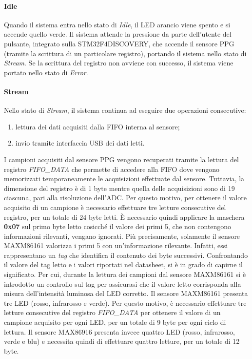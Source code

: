 \paragraph{Idle}
Quando il sistema entra nello stato di \textit{Idle}, il LED arancio viene spento e si accende quello verde. Il sistema attende la pressione da parte dell'utente del pulsante, integrato sulla STM32F4DISCOVERY, che accende il sensore PPG (tramite la scrittura di un particolare registro), portando il sistema nello stato di \textit{Stream}. Se la scrittura del registro non avviene con successo, il sistema viene portato nello stato di \textit{Error}.
\paragraph{Stream}
Nello stato di \textit{Stream}, il sistema continua ad eseguire due operazioni consecutive:
\begin{enumerate}
	\item lettura dei dati acquisiti dalla FIFO interna al sensore;
	\item invio tramite interfaccia USB dei dati letti.
\end{enumerate}
I campioni acquisiti dal sensore PPG vengono recuperati tramite la lettura del registro \textit{FIFO\_DATA} che permette di accedere alla FIFO dove vengono memorizzati temporaneamente le acquisizioni effettuate dal sensore. Tuttavia, la dimensione del registro è di 1 byte mentre quella delle acquisizioni sono di \SI{19}{\bit} ciascuna, pari alla risoluzione dell'ADC. Per questo motivo, per ottenere il valore acquisito di un campione è necessario effettuare tre letture consecutive del registro, per un totale di 24 byte letti. \`E necessario quindi applicare la maschera \textbf{0x07} sul primo byte letto cosicché il valore dei primi \SI{5}{\bit}, che non contengono informazioni rilevanti, vengano ignorati. Più precisamente, solamente il sensore MAXM86161 valorizza i primi \SI{5}{\bit} con un'informazione rilevante. Infatti, essi rappresentano un \textit{tag} che identifica il contenuto dei byte successivi. Confrontando il valore del tag letto e i valori riportati nel datasheet, si è in grado di capirne il significato. Per cui, durante la lettura dei campioni dal sensore MAXM86161 si è introdotto un controllo sul tag per assicurasi che il valore letto corrisponda alla misura dell'intensità luminosa del LED corretto. Il sensore MAXM86161 presenta tre LED (rosso, infrarosso e verde). Per questo motivo, è necessario effettuare tre letture consecutive del registro \textit{FIFO\_DATA} per ottenere il valore di un campione acquisito per ogni LED, per un totale di 9 byte per ogni ciclo di lettura. Il sensore MAX86916 presenta invece quattro LED (rosso, infrarosso, verde e blu) e necessita quindi di effettuare quattro letture, per un totale di 12 byte.

